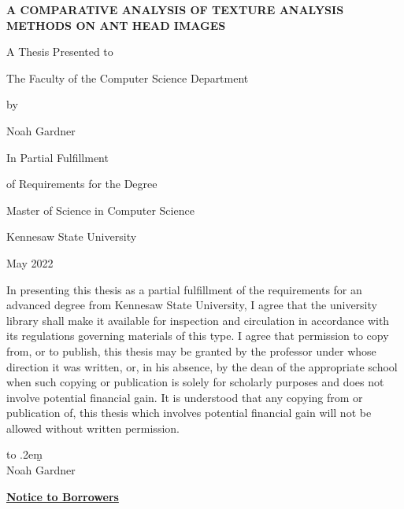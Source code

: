 \documentclass[12pt]{article}
\newcommand{\thesistitle}{
    {\Large A comparative analysis of texture analysis methods on
ant head images}
}
\begin{document}
\begin{center}
    \textbf{\MakeUppercase{\thesistitle}}
    \vspace{1in}

    A Thesis Presented to

    The Faculty of the Computer Science Department
    \vspace{1in}

    by
    \vspace{0.5in}

    Noah Gardner
    \vspace{1in}

    In Partial Fulfillment

    of Requirements for the Degree

    Master of Science in Computer Science

    \vspace{1in}
    Kennesaw State University

    May 2022
\end{center}
\thispagestyle{empty}
\newpage

\noindent In presenting this thesis as a partial fulfillment of the requirements
for an advanced degree from Kennesaw State University, I agree that the
university library shall make it available for inspection and circulation in
accordance with its regulations governing materials of this type. I agree that
permission to copy from, or to publish, this thesis may be granted by the
professor under whose direction it was written, or, in his absence, by the dean
of the appropriate school when such copying or publication is solely for
scholarly purposes and does not involve potential financial gain. It is
understood that any copying from or publication of, this thesis which involves
potential financial gain will not be allowed without written permission.
\vspace{2in}

\def\dotsign{\xleaders\hbox to .2em{\d{}}\hfill\d{}}
\begin{center}
    \makebox[.5\linewidth][r]\dotsign\smallskip\\
    Noah Gardner
\end{center}
\newpage

\begin{center}
    \textbf{\underline{Notice to Borrowers}}
\end{center}
\vspace{0.5in}
\end{document}
